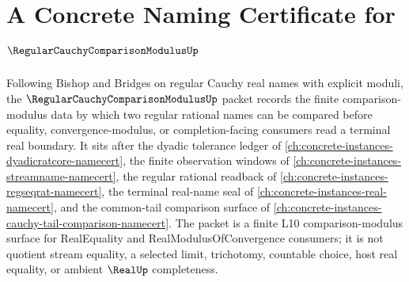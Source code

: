 \chapter{A Concrete Naming Certificate for $\RegularCauchyComparisonModulusUp$}
\label{ch:concrete-instances-regular-cauchy-comparison-modulus-namecert}

Following Bishop and Bridges on regular Cauchy real names with explicit moduli, the $\RegularCauchyComparisonModulusUp$ packet records the finite comparison-modulus data by which two regular rational names can be compared before equality, convergence-modulus, or completion-facing consumers read a terminal real boundary. It sits after the dyadic tolerance ledger of \autoref{ch:concrete-instances-dyadicratcore-namecert}, the finite observation windows of \autoref{ch:concrete-instances-streamname-namecert}, the regular rational readback of \autoref{ch:concrete-instances-regseqrat-namecert}, the terminal real-name seal of \autoref{ch:concrete-instances-real-namecert}, and the common-tail comparison surface of \autoref{ch:concrete-instances-cauchy-tail-comparison-namecert}. The packet is a finite L10 comparison-modulus surface for RealEquality and RealModulusOfConvergence consumers; it is not quotient stream equality, a selected limit, trichotomy, countable choice, host real equality, or ambient $\RealUp$ completeness.

